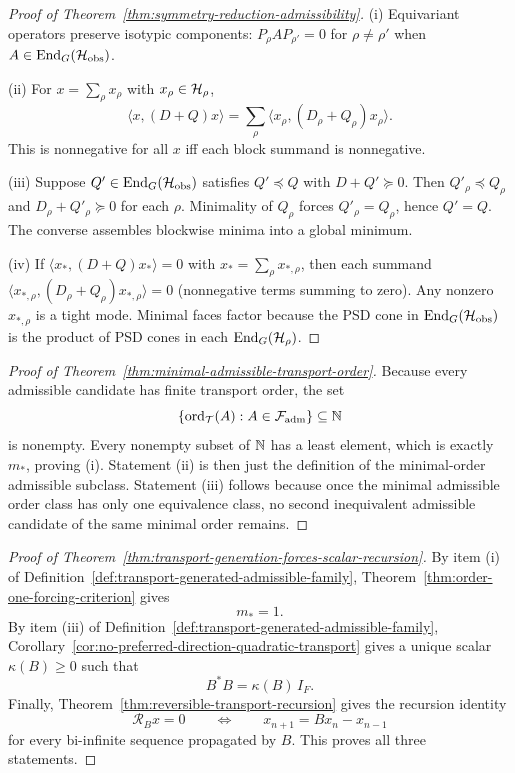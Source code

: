 \begin{proof}[Proof of Theorem~\ref{thm:symmetry-reduction-admissibility}]
\label{proof:thm:symmetry-reduction-admissibility}
(i) Equivariant operators preserve isotypic components: $P_\rho A P_{\rho'} = 0$ for $\rho \ne \rho'$ when $A \in \mathrm{End}_G(\mathcal{H}_{\mathrm{obs}})$.

(ii) For $x = \sum_\rho x_\rho$ with $x_\rho \in \mathcal{H}_\rho$,
\[
\langle x, (D + Q) x \rangle = \sum_\rho \langle x_\rho, (D_\rho + Q_\rho) x_\rho \rangle.
\]
This is nonnegative for all $x$ iff each block summand is nonnegative.

(iii) Suppose $Q' \in \mathrm{End}_G(\mathcal{H}_{\mathrm{obs}})$ satisfies $Q' \preceq Q$ with $D + Q' \succeq 0$.
Then $Q'_\rho \preceq Q_\rho$ and $D_\rho + Q'_\rho \succeq 0$ for each $\rho$.
Minimality of $Q_\rho$ forces $Q'_\rho = Q_\rho$, hence $Q' = Q$.
The converse assembles blockwise minima into a global minimum.

(iv) If $\langle x_*, (D + Q) x_* \rangle = 0$ with $x_* = \sum_\rho x_{*,\rho}$, then each summand $\langle x_{*,\rho}, (D_\rho + Q_\rho) x_{*,\rho} \rangle = 0$ (nonnegative terms summing to zero).
Any nonzero $x_{*,\rho}$ is a tight mode.
Minimal faces factor because the PSD cone in $\mathrm{End}_G(\mathcal{H}_{\mathrm{obs}})$ is the product of PSD cones in each $\mathrm{End}_G(\mathcal{H}_\rho)$.
\end{proof}

\begin{proof}[Proof of Theorem~\ref{thm:minimal-admissible-transport-order}]
\label{proof:thm:minimal-admissible-transport-order}
Because every admissible candidate has finite transport order, the set
\[
\{\operatorname{ord}_{\mathcal T}(A):A\in\mathcal F_{\mathrm{adm}}\}
\subseteq \mathbb{N}
\]
is nonempty. Every nonempty subset of $\mathbb{N}$ has a least element, which is
exactly $m_\ast$, proving (i). Statement (ii) is then just the definition of
the minimal-order admissible subclass. Statement (iii) follows because once the
minimal admissible order class has only one equivalence class, no second
inequivalent admissible candidate of the same minimal order remains.
\end{proof}

\begin{proof}[Proof of Theorem~\ref{thm:transport-generation-forces-scalar-recursion}]
\label{proof:thm:transport-generation-forces-scalar-recursion}
By item (i) of
Definition~\ref{def:transport-generated-admissible-family},
Theorem~\ref{thm:order-one-forcing-criterion} gives
\[
m_\ast=1.
\]
By item (iii) of
Definition~\ref{def:transport-generated-admissible-family},
Corollary~\ref{cor:no-preferred-direction-quadratic-transport} gives a unique
scalar $\kappa(B)\ge 0$ such that
\[
B^*B=\kappa(B)\,I_F.
\]
Finally, Theorem~\ref{thm:reversible-transport-recursion} gives the recursion
identity
\[
\mathcal R_Bx=0
\qquad\Longleftrightarrow\qquad
x_{n+1}=Bx_n-x_{n-1}
\]
for every bi-infinite sequence propagated by $B$. This proves all three
statements.
\end{proof}

